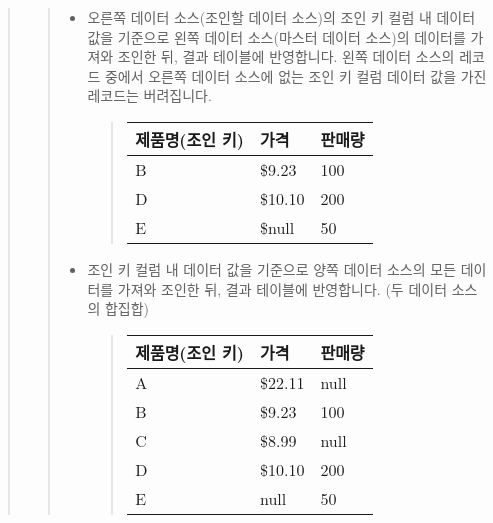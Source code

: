 \documentclass[letterpaper,10pt,english]{sphinxmanual}
\begin{document}
\begin{enumerate}
\begin{quote}
\begin{itemize}
\begin{quote}
\begin{itemize}
\item {} 
 오른쪽 데이터 소스(조인할 데이터 소스)의 조인 키 컬럼 내 데이터 값을 기준으로 왼쪽 데이터 소스(마스터 데이터 소스)의 데이터를 가져와 조인한 뒤, 결과 테이블에 반영합니다. 왼쪽 데이터 소스의 레코드 중에서 오른쪽 데이터 소스에 없는 조인 키 컬럼 데이터 값을 가진 레코드는 버려집니다.
\begin{quote}


\begin{savenotes}\sphinxattablestart
\centering
\begin{tabulary}{\linewidth}[t]{|T|T|T|}
\hline
\sphinxstyletheadfamily 
제품명(조인 키)
&\sphinxstyletheadfamily 
가격
&\sphinxstyletheadfamily 
판매량
\\
\hline
B
&
\$9.23
&
100
\\
\hline
D
&
\$10.10
&
200
\\
\hline
E
&
\$null
&
50
\\
\hline
\end{tabulary}
\par
\sphinxattableend\end{savenotes}
\end{quote}

\item {} 
 조인 키 컬럼 내 데이터 값을 기준으로 양쪽 데이터 소스의 모든 데이터를 가져와 조인한 뒤, 결과 테이블에 반영합니다. (두 데이터 소스의 합집합)
\begin{quote}


\begin{savenotes}\sphinxattablestart
\centering
\begin{tabulary}{\linewidth}[t]{|T|T|T|}
\hline
\sphinxstyletheadfamily 
제품명(조인 키)
&\sphinxstyletheadfamily 
가격
&\sphinxstyletheadfamily 
판매량
\\
\hline
A
&
\$22.11
&
null
\\
\hline
B
&
\$9.23
&
100
\\
\hline
C
&
\$8.99
&
null
\\
\hline
D
&
\$10.10
&
200
\\
\hline
E
&
null
&
50
\\
\hline
\end{tabulary}
\par
\sphinxattableend\end{savenotes}
\end{quote}

\end{itemize}
\end{quote}


\end{itemize}
\end{quote}
\end{enumerate}
\end{document}
